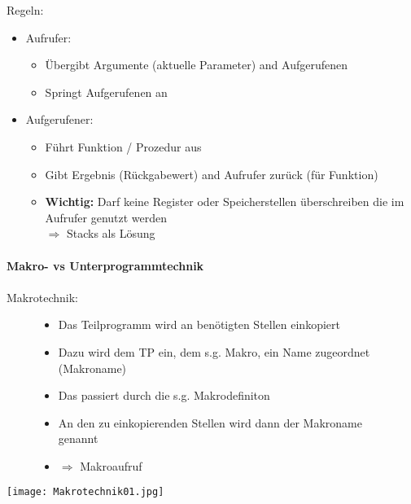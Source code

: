 		\noindent Regeln:
		\begin{itemize}
			\item Aufrufer:
				\begin{itemize}
					\item Übergibt Argumente (aktuelle Parameter) and Aufgerufenen
					\item Springt Aufgerufenen an
				\end{itemize}
			\item Aufgerufener:
				\begin{itemize}
					\item Führt Funktion / Prozedur aus
					\item Gibt Ergebnis (Rückgabewert) and Aufrufer zurück (für Funktion)
					\item \textbf{Wichtig:} Darf keine Register oder Speicherstellen überschreiben die im Aufrufer genutzt werden \\
							$\Longrightarrow$ Stacks als Lösung
				\end{itemize}
		\end{itemize}
		\vspace{0.4cm}


		\paragraph{Makro- vs Unterprogrammtechnik}

		\paragraph{} Makrotechnik: \\
		\begin{minipage}{0.6\textwidth}
			\begin{figure}[H]
					\begin{itemize}
						\item Das Teilprogramm wird an benötigten Stellen einkopiert
						\item Dazu wird dem TP ein, dem s.g. Makro, ein Name zugeordnet (Makroname)
						\item Das passiert durch die s.g. Makrodefiniton
						\item An den zu einkopierenden Stellen wird dann der Makroname genannt
						\item $\Rightarrow$ Makroaufruf
					\end{itemize}
				\end{figure}
			\end{minipage} \hfill
		\begin{minipage}{0.35\textwidth}
			\texttt{[image: Makrotechnik01.jpg]}
		\end{minipage}

